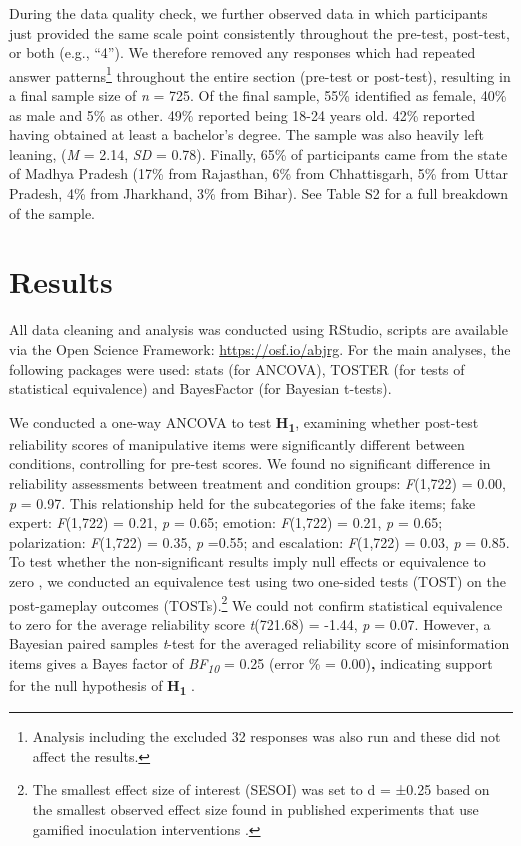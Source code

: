 \documentclass[empirical, authordate, issue]{jote-new-article}
\begin{document}
During the data quality check, we further observed data in which participants just provided the same scale point consistently throughout the pre-test, post-test, or both (e.g., “4”). We therefore removed any responses which had repeated answer patterns\footnote{Analysis including the excluded 32 responses was also run and these did not affect the results.} throughout the entire section (pre-test or post-test), resulting in a final sample size of \emph{n} = 725. Of the final sample, 55\% identified as female, 40\% as male and 5\% as other. 49\% reported being 18-24 years old. 42\% reported having obtained at least a bachelor's degree. The sample was also heavily left leaning, (\emph{M} = 2.14, \emph{SD} = 0.78). Finally, 65\% of participants came from the state of Madhya Pradesh (17\% from Rajasthan, 6\% from Chhattisgarh, 5\% from Uttar Pradesh, 4\% from Jharkhand, 3\% from Bihar). See Table S2 for a full breakdown of the sample.

\section{Results }

All data cleaning and analysis was conducted using RStudio, scripts are available via the Open Science Framework: \url{https://osf.io/abjrg}. For the main analyses, the following packages were used: stats (for ANCOVA), TOSTER (for tests of statistical equivalence) and BayesFactor (for Bayesian t-tests).

We conducted a one-way ANCOVA to test \textbf{H}\textsubscript{\textbf{1}},\textbf{ }examining whether post-test reliability scores of manipulative items were significantly different between conditions, controlling for pre-test scores. We found no significant difference in reliability assessments between treatment and condition groups: \emph{F}(1,722) = 0.00, \emph{p} = 0.97. This relationship held for the subcategories of the fake items; fake expert: \emph{F}(1,722) = 0.21, \emph{p }= 0.65; emotion: \emph{F}(1,722) = 0.21, \emph{p }= 0.65; polarization: \emph{F}(1,722) = 0.35, \emph{p }=0.55; and escalation: \emph{F}(1,722) = 0.03, \emph{p} = 0.85. To test whether the non-significant results imply null effects or equivalence to zero \parencite{Lakens2018}, we conducted an equivalence test using two one-sided tests (TOST) on the post-gameplay outcomes (TOSTs).\footnote{The smallest effect size of interest (SESOI) was set to d = ±0.25 based on the smallest observed effect size found in published experiments that use gamified inoculation interventions \parencite{Roozenbeek2019}.} We could not confirm statistical equivalence to zero for the average reliability score \emph{t}(721.68) = -1.44, \emph{p} = 0.07. However, a Bayesian paired samples \emph{t}-test for the averaged reliability score of misinformation items gives a Bayes factor of \emph{BF}\textsubscript{\emph{10 }}= 0.25 (error \% = 0.00)\textbf{,} indicating support for the null hypothesis of \textbf{H}\textsubscript{\textbf{1}} \parencite{Dienes2014}.
\end{document}
